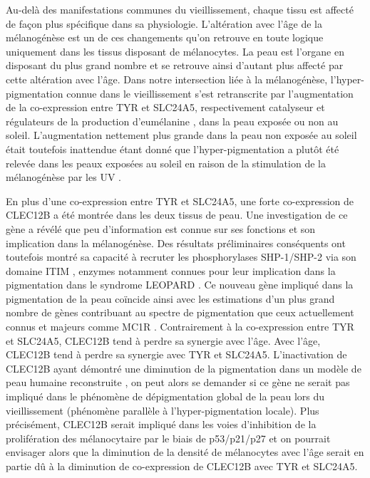 Au-delà des manifestations communes du vieillissement, chaque tissu est affecté de façon plus spécifique dans sa physiologie. L'altération avec l'âge de la mélanogénèse est un de ces changements qu'on retrouve en toute logique uniquement dans les tissus disposant de mélanocytes. La peau est l'organe en disposant du plus grand nombre et se retrouve ainsi d'autant plus affecté par cette altération avec l'âge. Dans notre intersection liée à la mélanogénèse, l'hyper-pigmentation connue dans le vieillissement  s'est retranscrite par l'augmentation de la co-expression entre TYR et SLC24A5, respectivement catalyseur et régulateurs de la production d'eumélanine , dans la peau exposée ou non au soleil. L'augmentation nettement plus grande dans la peau non exposée au soleil était toutefois inattendue étant donné que l'hyper-pigmentation a plutôt été relevée dans les peaux exposées au soleil en raison de la stimulation de la mélanogénèse par les UV . 

En plus d'une co-expression entre TYR et SLC24A5, une forte co-expression de CLEC12B a été montrée dans les deux tissus de peau. Une investigation de ce gène a révélé que peu d'information est connue sur ses fonctions et son implication dans la mélanogénèse. Des résultats préliminaires conséquents ont toutefois montré sa capacité à recruter les phosphorylases SHP-1/SHP-2 via son domaine ITIM , enzymes notamment connues pour leur implication dans la pigmentation dans le syndrome LEOPARD . Ce nouveau gène impliqué dans la pigmentation de la peau coïncide ainsi avec les estimations d'un plus grand nombre de gènes contribuant au spectre de pigmentation que ceux actuellement connus et majeurs comme MC1R . 
Contrairement à la co-expression entre TYR et SLC24A5, CLEC12B tend à perdre sa synergie avec l'âge. Avec l'âge, CLEC12B tend à perdre sa synergie avec TYR et SLC24A5. L'inactivation de CLEC12B ayant démontré une diminution de la pigmentation dans un modèle de peau humaine reconstruite , on peut alors se demander si ce gène ne serait pas impliqué dans le phénomène de dépigmentation global de la peau lors du vieillissement (phénomène parallèle à l'hyper-pigmentation locale). Plus précisément, CLEC12B serait impliqué dans les voies d'inhibition de la prolifération des mélanocytaire par le biais de p53/p21/p27  et on pourrait envisager alors que la diminution de la densité de mélanocytes avec l'âge serait en partie dû à la diminution de co-expression de CLEC12B avec TYR et SLC24A5.


